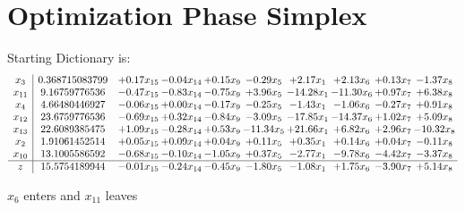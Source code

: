 \documentclass[9pt]{article}
\begin{document}
\section{Optimization Phase Simplex}
Starting Dictionary is:
\[\begin{array}{c| c c@{\hskip 2pt} c@{\hskip 2pt} c@{\hskip 2pt} c@{\hskip 2pt} c@{\hskip 2pt} c@{\hskip 2pt} c@{\hskip 2pt} c@{\hskip 2pt} }
 x_{3}   &  0.368715083799 & +  0.17 x_{15} & -0.04 x_{14} & +  0.15 x_{9} & -0.29 x_{5} & +  2.17 x_{1} & +  2.13 x_{6} & +  0.13 x_{7} & -1.37 x_{8}\\
 x_{11}   &  9.16759776536 & -0.47 x_{15} & -0.83 x_{14} & -0.75 x_{9} & +  3.96 x_{5} & -14.28 x_{1} & -11.30 x_{6} & +  0.97 x_{7} & +  6.38 x_{8}\\
 x_{4}   &  4.66480446927 & -0.06 x_{15} & +  0.00 x_{14} & -0.17 x_{9} & -0.25 x_{5} & -1.43 x_{1} & -1.06 x_{6} & -0.27 x_{7} & +  0.91 x_{8}\\
 x_{12}   &  23.6759776536 & -0.69 x_{15} & +  0.32 x_{14} & -0.84 x_{9} & -3.09 x_{5} & -17.85 x_{1} & -14.37 x_{6} & +  1.02 x_{7} & +  5.09 x_{8}\\
 x_{13}   &  22.6089385475 & +  1.09 x_{15} & -0.28 x_{14} & +  0.53 x_{9} & -11.34 x_{5} & + 21.66 x_{1} & +  6.82 x_{6} & +  2.96 x_{7} & -10.32 x_{8}\\
 x_{2}   &  1.91061452514 & +  0.05 x_{15} & +  0.09 x_{14} & +  0.04 x_{9} & +  0.11 x_{5} & +  0.35 x_{1} & +  0.14 x_{6} & +  0.04 x_{7} & -0.11 x_{8}\\
 x_{10}   &  13.1005586592 & -0.68 x_{15} & -0.10 x_{14} & -1.05 x_{9} & +  0.37 x_{5} & -2.77 x_{1} & -9.78 x_{6} & -4.42 x_{7} & -3.37 x_{8}\\
\hline
z    &  15.5754189944 & -0.01 x_{15} & -0.24 x_{14} & -0.45 x_{9} & -1.80 x_{5} & -1.08 x_{1} & +  1.75 x_{6} & -3.90 x_{7} & +  5.14 x_{8}\\
\end{array}\]


 $ x_{6} $ enters and $ x_{11} $ leaves 
\end{document}

